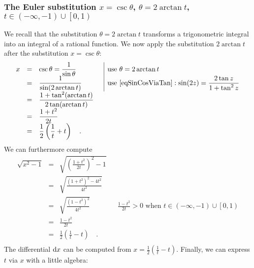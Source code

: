 \documentclass[12pt]{book}
\begin{document}
\subsubsection{The Euler substitution $x=\csc \theta$, $\theta=2\arctan t$, $ t\in (-\infty, -1) \cup \left[0, 1 \right) $ }
We recall that the substitution $\theta = 2\arctan t$ transforms a trigonometric integral into an integral of a rational function. We now apply the substitution $2\arctan t$ after the substitution $x=\csc \theta$:
\begin{equation*}
\begin{array}{rcll|l}
x&=&\displaystyle \csc \theta =\frac{1}{\sin \theta} & & \text{use } \theta=2\arctan t\\
&=&\displaystyle \frac{1}{\sin (2\arctan t)} &&\text{use } \eqref{eqSinCosViaTan}: \displaystyle \sin (2z) = \frac{ 2\tan z }{1+ \tan^2 z}\\
&=&\displaystyle \frac{1+\tan^2(\arctan t)}{2\tan( \arctan t)} \\
&=&\displaystyle \frac{1+t^2}{2t} \\
&=&\displaystyle \frac{1}{2}\left(\frac{1}t+t\right)\quad .
\end{array}
\end{equation*}
We can furthermore compute
\begin{equation}\label{eqsqrtxsquareminus1E1}
\begin{array}{rcll|l}
\sqrt{x^2-1 }&=&\displaystyle \sqrt{ \left( \frac{1+t^2}{ 2t } \right)^2 -1}\\
&=& \displaystyle \sqrt{\frac{(1+t^2)^2-4t^2 }{ 4t^2} }\\
&=&\displaystyle \sqrt{\frac{(1-t^2)^2}{4t^2}} &&\displaystyle \frac{1-t^2}{2t}>0\text{ when } t\in (-\infty, -1) \cup \left[0, 1 \right)  \\
&=&\displaystyle \frac{1-t^2}{2t}\\
&=&\displaystyle\frac{1}{2}\left(\frac{1}{t}-t\right)\quad .\\
\end{array}
\end{equation}
The differential ${\normalfont \text{d}} x$ can be computed from $x=\frac{1}{2}\left(\frac{1}{t}-t\right)$. Finally, we can express $t$ via $x$ with a little algebra:
\end{document}
